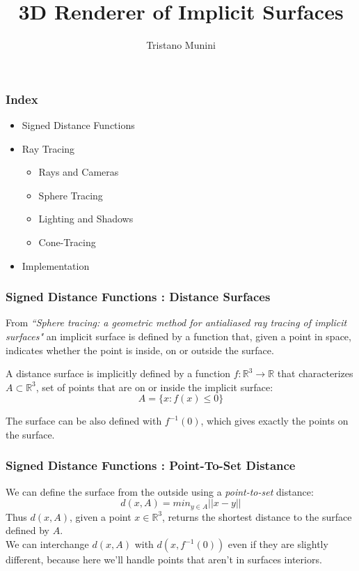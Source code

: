 \documentclass{beamer}
\title{3D Renderer of Implicit Surfaces}
\author{Tristano Munini}
\newcommand{\norm}[1]{\lvert\lvert #1 \lvert\lvert}
\newcommand\R{\ensuremath{\mathbb{R}}}
\begin{document}
{
  \frame{\titlepage}
}

\begin{frame}
\frametitle{Index}
\begin{itemize}
  \item Signed Distance Functions
  \item Ray Tracing
    \begin{itemize}
      \item Rays and Cameras
      \item Sphere Tracing
      \item Lighting and Shadows
      \item Cone-Tracing
    \end{itemize}
  \item Implementation
\end{itemize}
\end{frame}

\begin{frame}
\frametitle{Signed Distance Functions : Distance Surfaces}
From \emph{``Sphere tracing: a geometric method for antialiased ray tracing of implicit surfaces"} an implicit surface is defined by a function that, given a point in space, indicates whether the point is inside, on or outside the surface.

\begin{definition}
A distance surface is implicitly defined by a function 
$f : \R^3 \to \R$ that characterizes $A \subset \R^3$, set of points that are on or inside the implicit surface:
$$ A = \{ x: f(x) \leq 0\} $$
\end{definition}

The surface can be also defined with $f^{-1}(0)$, which gives exactly the points on the surface.
\end{frame}

\begin{frame}
\frametitle{Signed Distance Functions : Point-To-Set Distance}
We can define the surface from the outside using a \emph{point-to-set} distance:
$$
d(x,A) = min_{y \in A} \norm{x - y}
$$
Thus $d(x,A)$, given a point $x \in \R^3$, returns the shortest distance to the surface defined by $A$.
\\
We can interchange $d(x,A)$ with $d(x, f^{-1}(0))$ even if they are slightly different, because here we'll handle points that aren't in surfaces interiors.
\end{frame}
\end{document}
